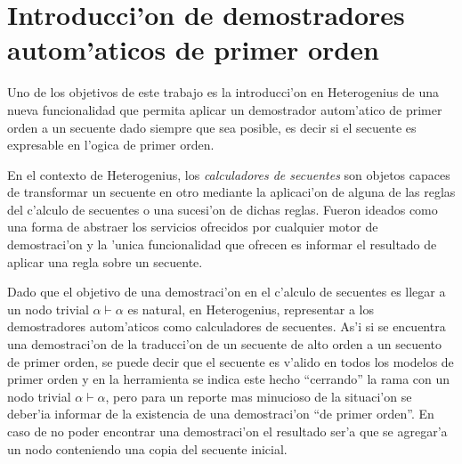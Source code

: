 \section{Introducci'on de demostradores autom'aticos de primer orden}

Uno de los objetivos de este trabajo es la introducci'on en Heterogenius de una nueva funcionalidad que permita aplicar un demostrador autom'atico de primer orden a un secuente dado siempre que sea posible, es decir si el secuente es expresable en l'ogica de primer orden.

En el contexto de Heterogenius, los \textit{calculadores de secuentes} son objetos capaces de transformar un secuente en otro mediante la aplicaci'on de alguna de las reglas del c'alculo de secuentes o una sucesi'on de dichas reglas. Fueron ideados como una forma de abstraer los servicios ofrecidos por cualquier motor de demostraci'on y la 'unica funcionalidad que ofrecen es informar el resultado de aplicar una regla sobre un secuente.

Dado que el objetivo de una demostraci'on en el c'alculo de secuentes es llegar a un nodo trivial $\alpha \vdash \alpha$ es natural, en Heterogenius, representar a los demostradores autom'aticos como calculadores de secuentes. As'i si se encuentra una demostraci'on de la traducci'on de un secuente de alto orden a un secuento de primer orden, se puede decir que el secuente es v'alido en todos los modelos de primer orden y en la herramienta se indica este hecho ``cerrando'' la rama con un nodo trivial $\alpha \vdash \alpha$, pero para un reporte mas minucioso de la situaci'on se deber'ia informar de la existencia de una demostraci'on ``de primer orden''. En caso de no poder encontrar una demostraci'on el resultado ser'a que se agregar'a un nodo conteniendo una copia del secuente inicial.